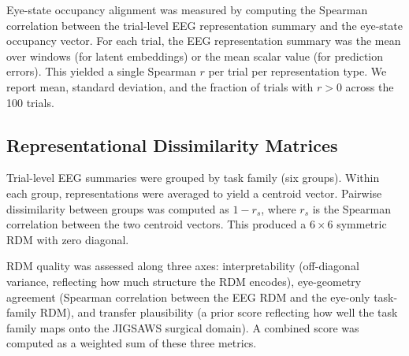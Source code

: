 \documentclass[11pt, letterpaper]{article}
\begin{document}
Eye-state occupancy alignment was measured by computing the Spearman correlation
between the trial-level EEG representation summary and the eye-state occupancy vector.
For each trial, the EEG representation summary was the mean over windows (for latent
embeddings) or the mean scalar value (for prediction errors). This yielded a single
Spearman $r$ per trial per representation type. We report mean, standard deviation,
and the fraction of trials with $r > 0$ across the 100 trials.

\subsection{Representational Dissimilarity Matrices}

Trial-level EEG summaries were grouped by task family (six groups). Within each group,
representations were averaged to yield a centroid vector. Pairwise dissimilarity between
groups was computed as $1 - r_s$, where $r_s$ is the Spearman correlation between the
two centroid vectors. This produced a $6 \times 6$ symmetric RDM with zero diagonal.

RDM quality was assessed along three axes: interpretability (off-diagonal variance,
reflecting how much structure the RDM encodes), eye-geometry agreement (Spearman
correlation between the EEG RDM and the eye-only task-family RDM), and transfer
plausibility (a prior score reflecting how well the task family maps onto the JIGSAWS
surgical domain). A combined score was computed as a weighted sum of these three metrics.

\newpage


\end{document}
